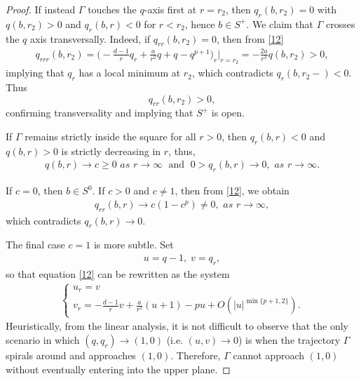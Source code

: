 \documentclass[12pt]{amsart}
\begin{document}
\begin{proof}
If instead $\Gamma$ touches the $q$-axis  first at $r= r_2$, 
then $q_r(b,r_2)=0$ with $q(b,r_2)>0$ and $q_r(b,r)<0$ for $r<r_2$, hence $b\in S^+$. We claim that $\Gamma $ crosses the $q$ axis transversally. Indeed, if $q_{rr}(b,r_2)=0$, then from \eqref{12}
\begin{align*}
q_{rrr}(b,r_2)=\bigl (-\tfrac{d-1}r q_r+\tfrac a{r^2}q+q-q^{p+1}\bigr)_r\bigl|_{r=r_2}=-\tfrac{2a}{r^3} q(b,r_2)>0, 
\end{align*}
implying that $q_r$ has a local minimum at $r_2$, which contradicts $q_r (b, r_2-)<0$. Thus
 \begin{equation} \label{69}
q_{rr}(b,r_2)> 0, 
\end{equation} 
confirming transversality and implying that $S^+$ is open. 

If $\Gamma$ remains strictly inside the square for all $r> 0$, then $q_r(b,r)<0$ and $q(b,r)>0$ is strictly decreasing in $r$, thus,
\begin{align}\label{70}
q(b,r)\to c\ge 0 \textit{ as } r\to \infty
\; \text{ and } \; 
0> q_r(b,r)\to 0, \textit{ as } r\to \infty. 
\end{align}

If $c=0$, then $b\in S^0$. If $c>0$ and $c\neq 1$, then from \eqref{12}, we obtain
\begin{align}\label{72}
q_{rr}(b,r)\to c(1-c^p)\neq 0, \textit{ as } r\to \infty, 
\end{align}
which contradicts $q_r(b,r)\to 0$.

The final case $c=1$ is more subtle. Set 
\begin{align*}
u=q-1, \; v=q_r,
\end{align*}
so that equation \eqref{12} can be rewritten as the system 
\begin{align}\label{74}
\begin{cases}
u_r=v\\
v_r=-\tfrac{d-1}r v+\tfrac a{r^2}(u+1)-pu+O(|u|^{\min\{ p+1, 2\}}). 
\end{cases}
\end{align}
Heuristically, from the linear analysis, it is not difficult to observe that the only scenario in which $(q,q_r)\to (1,0)$ (i.e. $(u,v)\to 0$) is when the trajectory $\Gamma$ spirals around and approaches $(1,0)$. Therefore, $\Gamma$ cannot approach $(1,0)$ without eventually entering into the upper plane. 


\end{proof}
\end{document}
